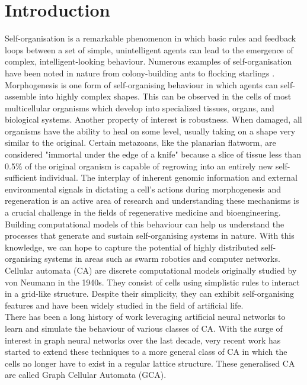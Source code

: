 \chapter{Introduction}

Self-organisation is a remarkable phenomenon in which basic rules and feedback loops between a set of simple, unintelligent agents can lead to the emergence of complex, intelligent-looking behaviour. Numerous examples of self-organisation have been noted in nature from colony-building ants \cite{bonabeau1997self} to flocking starlings \cite{couzin2003self}. 
Morphogenesis is one form of self-organising behaviour in which agents can self-assemble into highly complex shapes. This can be observed in the cells of most multicellular organisms which develop into specialized tissues, organs, and biological systems. Another property of interest is robustness. When damaged, all organisms have the ability to heal on some level, usually taking on a shape very similar to the original. Certain metazoans, like the planarian flatworm, are considered "immortal under the edge of a knife" \cite{dalyell1814observations} because a slice of tissue less than 0.5\% of the original organism is capable of regrowing into an entirely new self-sufficient individual. The interplay of inherent genomic information and external environmental signals in dictating a cell's actions during morphogenesis and regeneration is an active area of research \cite{pai2012transmembrane} and understanding these mechanisms is a crucial challenge in the fields of regenerative medicine and bioengineering.\\

Building computational models of this behaviour can help us understand the processes that generate and sustain self-organising systems in nature. With this knowledge, we can hope to capture the potential of highly distributed self-organising systems in areas such as swarm robotics and computer networks. Cellular automata (CA) are discrete computational models originally studied by von Neumann in the 1940s. They consist of cells using simplistic rules to interact in a grid-like structure. Despite their simplicity, they can exhibit self-organising features and have been widely studied in the field of artificial life.\\

There has been a long history of work leveraging artificial neural networks to learn and simulate the behaviour of various classes of CA. With the surge of interest in graph neural networks over the last decade, very recent work has started to extend these techniques to a more general class of CA in which the cells no longer have to exist in a regular lattice structure. These generalised CA are called Graph Cellular Automata (GCA). \\

